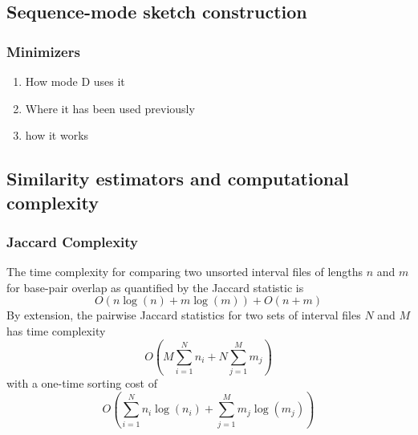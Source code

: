 \documentclass[11pt]{article}
\begin{document}

\subsection{Sequence-mode sketch construction}
\subsubsection{Minimizers}
\begin{enumerate}
    \item How mode D uses it
    \item Where it has been used previously
    \item how it works
\end{enumerate}
\subsection{Similarity estimators and computational complexity}

\subsubsection{Jaccard Complexity}

The time complexity for comparing two unsorted interval files of lengths $n$ and $m$ for base-pair overlap as quantified by the Jaccard statistic is 
\begin{equation}
    O(n\log(n) + m\log(m)) + O(n+m)
\end{equation}
By extension, the pairwise Jaccard statistics for two sets of interval files $N$ and $M$ has time complexity
\begin{equation}
    O\left(
M \sum_{i=1}^{N} n_i + N \sum_{j=1}^{M} m_j\right)
\end{equation}
with a one-time sorting cost of
\begin{equation}
O\left(\sum_{i=1}^{N} n_i\log(n_i) + \sum_{j=1}^{M} m_j\log(m_j)\right)
\end{equation}
\end{document}

